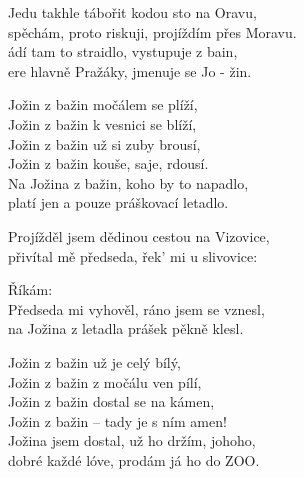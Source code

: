 
\ve{}
Jedu takhle tábořit kodou sto na Oravu,\\
spěchám, proto riskuji, projíždím přes Moravu.\\
ádí tam to straidlo, vystupuje z bain,\\
ere hlavně Pražáky, jmenuje se Jo - žin.

\cho{}
Jožin z bažin močálem se plíží,\\
Jožin z bažin k vesnici se blíží,\\
Jožin z bažin už si zuby brousí,\\
Jožin z bažin kouše, saje, rdousí.\\
Na Jožina z bažin, koho by to napadlo,\\
platí jen a pouze práškovací letadlo. 

\ve{}
Projížděl jsem dědinou cestou na Vizovice,\\
přivítal mě předseda, řek' mi u slivovice:\\

\cho{}

\ve{}
Říkám: \\
Předseda mi vyhověl, ráno jsem se vznesl,\\
na Jožina z letadla prášek pěkně klesl.

\cho{}
Jožin z bažin už je celý bílý,\\
Jožin z bažin z močálu ven pílí,\\
Jožin z bažin dostal se na kámen,\\
Jožin z bažin -- tady je s ním amen!\\
Jožina jsem dostal, už ho držím, johoho,\\
dobré každé lóve, prodám já ho do ZOO. 

\esong